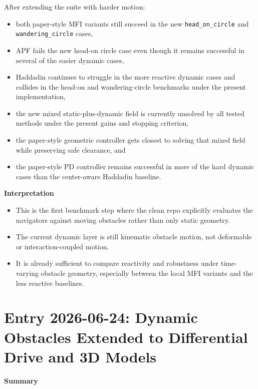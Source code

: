 \documentclass[11pt]{article}
\begin{document}
After extending the suite with harder motion:
\begin{itemize}[leftmargin=*]
  \item both paper-style MFI variants still succeed in the new \texttt{head\_on\_circle} and \texttt{wandering\_circle} cases,
  \item APF fails the new head-on circle case even though it remains successful in several of the easier dynamic cases,
  \item Haddadin continues to struggle in the more reactive dynamic cases and collides in the head-on and wandering-circle benchmarks under the present implementation,
  \item the new mixed static-plus-dynamic field is currently unsolved by all tested methods under the present gains and stopping criterion,
  \item the paper-style geometric controller gets closest to solving that mixed field while preserving safe clearance, and
  \item the paper-style PD controller remains successful in more of the hard dynamic cases than the center-aware Haddadin baseline.
\end{itemize}

\textbf{Interpretation}

\begin{itemize}[leftmargin=*]
  \item This is the first benchmark step where the clean repo explicitly evaluates the navigators against moving obstacles rather than only static geometry.
  \item The current dynamic layer is still kinematic obstacle motion, not deformable or interaction-coupled motion.
  \item It is already sufficient to compare reactivity and robustness under time-varying obstacle geometry, especially between the local MFI variants and the less reactive baselines.
\end{itemize}

\section*{Entry 2026-06-24: Dynamic Obstacles Extended to Differential Drive and 3D Models}

\textbf{Summary}
\end{document}
